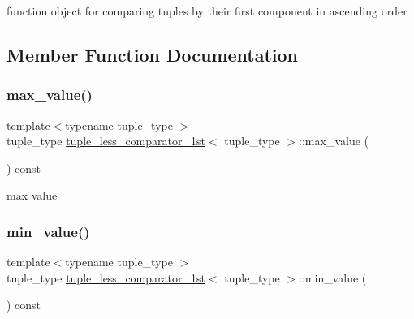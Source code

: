 function object for comparing tuples by their first component in ascending order 

\subsection{Member Function Documentation}
\mbox{\label{structtuple__less__comparator__1st_ab43723d6ebd5e36767f98828e2df83a8}} 
\subsubsection{\texorpdfstring{max\+\_\+value()}{max\_value()}}
{\footnotesize\ttfamily template$<$typename tuple\+\_\+type $>$ \\
tuple\+\_\+type \hyperlink{structtuple__less__comparator__1st}{tuple\+\_\+less\+\_\+comparator\+\_\+1st}$<$ tuple\+\_\+type $>$\+::max\+\_\+value (\begin{DoxyParamCaption}{ }\end{DoxyParamCaption}) const\hspace{0.3cm}{\ttfamily [inline]}}



max value 

\mbox{\label{structtuple__less__comparator__1st_a1dc22790efdf3705634387a96a848d89}} 
\subsubsection{\texorpdfstring{min\+\_\+value()}{min\_value()}}
{\footnotesize\ttfamily template$<$typename tuple\+\_\+type $>$ \\
tuple\+\_\+type \hyperlink{structtuple__less__comparator__1st}{tuple\+\_\+less\+\_\+comparator\+\_\+1st}$<$ tuple\+\_\+type $>$\+::min\+\_\+value (\begin{DoxyParamCaption}{ }\end{DoxyParamCaption}) const\hspace{0.3cm}{\ttfamily [inline]}}



